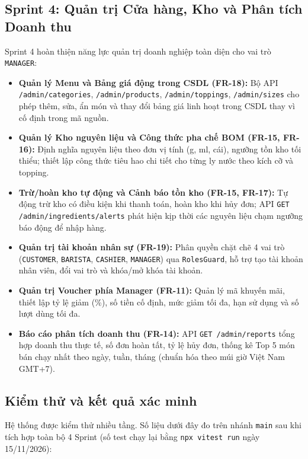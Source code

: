 \documentclass[12pt, a4paper]{article}
\begin{document}
\subsection{Sprint 4: Quản trị Cửa hàng, Kho và Phân tích Doanh thu}
Sprint 4 hoàn thiện năng lực quản trị doanh nghiệp toàn diện cho vai trò \texttt{MANAGER}:
\begin{itemize}
  \item \textbf{Quản lý Menu và Bảng giá động trong CSDL (FR-18):} Bộ API \texttt{/admin/categories}, \texttt{/admin/products}, \texttt{/admin/toppings}, \texttt{/admin/sizes} cho phép thêm, sửa, ẩn món và thay đổi bảng giá linh hoạt trong CSDL thay vì cố định trong mã nguồn.
  \item \textbf{Quản lý Kho nguyên liệu và Công thức pha chế BOM (FR-15, FR-16):} Định nghĩa nguyên liệu theo đơn vị tính (g, ml, cái), ngưỡng tồn kho tối thiểu; thiết lập công thức tiêu hao chi tiết cho từng ly nước theo kích cỡ và topping.
  \item \textbf{Trừ/hoàn kho tự động và Cảnh báo tồn kho (FR-15, FR-17):} Tự động trừ kho có điều kiện khi thanh toán, hoàn kho khi hủy đơn; API \texttt{GET /admin/ingredients/alerts} phát hiện kịp thời các nguyên liệu chạm ngưỡng báo động để nhập hàng.
  \item \textbf{Quản trị tài khoản nhân sự (FR-19):} Phân quyền chặt chẽ 4 vai trò (\texttt{CUSTOMER}, \texttt{BARISTA}, \texttt{CASHIER}, \texttt{MANAGER}) qua \texttt{RolesGuard}, hỗ trợ tạo tài khoản nhân viên, đổi vai trò và khóa/mở khóa tài khoản.
  \item \textbf{Quản trị Voucher phía Manager (FR-11):} Quản lý mã khuyến mãi, thiết lập tỷ lệ giảm (\%), số tiền cố định, mức giảm tối đa, hạn sử dụng và số lượt dùng tối đa.
  \item \textbf{Báo cáo phân tích doanh thu (FR-14):} API \texttt{GET /admin/reports} tổng hợp doanh thu thực tế, số đơn hoàn tất, tỷ lệ hủy đơn, thống kê Top 5 món bán chạy nhất theo ngày, tuần, tháng (chuẩn hóa theo múi giờ Việt Nam GMT+7).
\end{itemize}

\subsection{Kiểm thử và kết quả xác minh}
Hệ thống được kiểm thử nhiều tầng. Số liệu dưới đây đo trên nhánh \texttt{main} sau khi tích hợp toàn bộ 4 Sprint (số test chạy lại bằng \texttt{npx vitest run} ngày 15/11/2026):
\end{document}
